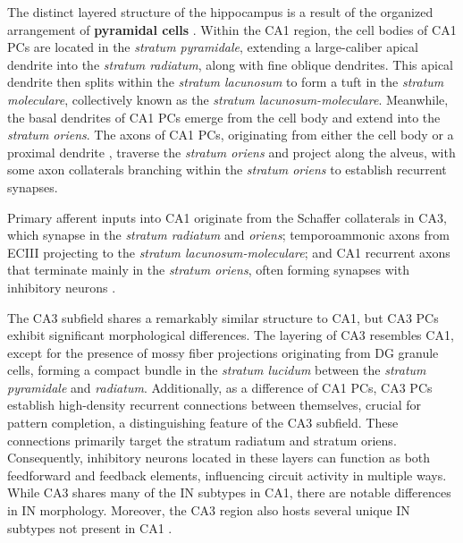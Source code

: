 \documentclass[../main.tex]{subfiles}
\begin{document}
The distinct layered structure of the hippocampus is a result of the organized arrangement of \textbf{pyramidal cells} \citep{amaral1989three}. Within the CA1 region, the cell bodies of CA1 PCs are located in the \textit{stratum pyramidale}, extending a large-caliber apical dendrite into the \textit{stratum radiatum}, along with fine oblique dendrites.
This apical dendrite then splits within the \textit{stratum lacunosum} to form a tuft in the \textit{stratum moleculare}, collectively known as the \textit{stratum lacunosum-moleculare}. 
Meanwhile, the basal dendrites of CA1 PCs emerge from the cell body and extend into the \textit{stratum oriens}.
The axons of CA1 PCs, originating from either the cell body or a proximal dendrite \citep{thome2014axon}, traverse the \textit{stratum oriens} and project along the alveus, with some axon collaterals branching within the \textit{stratum oriens} to establish recurrent synapses.

Primary afferent inputs into CA1 originate from the Schaffer collaterals in CA3, which synapse in the \textit{stratum radiatum} and \textit{oriens}; temporoammonic axons from ECIII projecting to the \textit{stratum lacunosum-moleculare}; and CA1 recurrent axons that terminate mainly in the \textit{stratum oriens}, often forming synapses with inhibitory neurons \citep{takacs2012extrinsic}.

The CA3 subfield shares a remarkably similar structure to CA1, but CA3 PCs exhibit significant morphological differences.
The layering of CA3 resembles CA1, except for the presence of mossy fiber projections originating from DG granule cells, forming a compact bundle in the \textit{stratum lucidum} between the \textit{stratum pyramidale} and \textit{radiatum}.
Additionally, as a difference of CA1 PCs, CA3 PCs establish high-density recurrent connections between themselves, crucial for pattern completion, a distinguishing feature of the CA3 subfield.
These connections primarily target the stratum radiatum and stratum oriens.
Consequently, inhibitory neurons located in these layers can function as both feedforward and feedback elements, influencing circuit activity in multiple ways.
While CA3 shares many of the IN subtypes in CA1, there are notable differences in IN morphology.
Moreover, the CA3 region also hosts several unique IN subtypes not present in CA1 \citep{tukker2007cell}.
\end{document}
